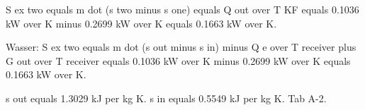 S ex two equals m dot (s two minus s one) equals Q out over T KF equals 0.1036 kW over K minus 0.2699 kW over K equals 0.1663 kW over K.

Wasser:
S ex two equals m dot (s out minus s in) minus Q e over T receiver plus G out over T receiver equals 0.1036 kW over K minus 0.2699 kW over K equals 0.1663 kW over K.

s out equals 1.3029 kJ per kg K.
s in equals 0.5549 kJ per kg K. Tab A-2.